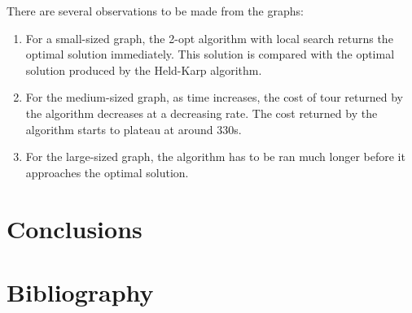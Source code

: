 \documentclass[paper=a4, fontsize=11pt]{scrartcl}	%
\numberwithin{equation}{section}		%
\numberwithin{figure}{section}			%
\numberwithin{table}{section}				%
\begin{document}
\begin{center}
\end{center}

There are several observations to be made from the graphs:
\begin{enumerate}
\item For a small-sized graph, the 2-opt algorithm with local search returns the optimal solution immediately. This solution is compared with the optimal solution produced by the Held-Karp algorithm.
\item For the medium-sized graph, as time increases, the cost of tour returned by the algorithm decreases at a decreasing rate. The cost returned by the algorithm starts to plateau at around 330s.
\item For the large-sized graph, the algorithm has to be ran much longer before it approaches the optimal solution.
\end{enumerate}

\section{Conclusions}

\section{Bibliography}

\nocite{*}

\end{document}
